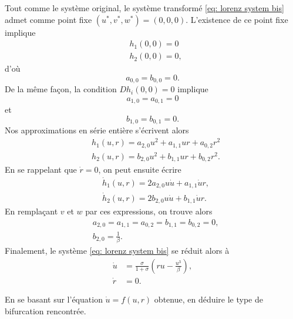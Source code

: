 \documentclass[12pt, answers]{exam}
\begin{document}
\begin{questions}
\begin{parts}
\begin{subparts}
      \begin{solution}
        {\color{blue}
        Tout comme le système original, le système transformé \eqref{eq: lorenz system bis} admet comme point fixe $(u^*, v^*, w^*) = (0, 0, 0)$. L'existence de ce point fixe implique
        $$
        \begin{aligned}
          & h_1(0, 0) = 0 \\
          & h_2(0, 0) = 0,
        \end{aligned}
        $$
        d'où
        $$
        a_{0, 0} = b_{0, 0} = 0.
        $$
        De la même fa\c{c}on, la condition $Dh_i(0, 0) = 0$ implique
        $$
        a_{1, 0} = a_{0, 1} = 0
        $$
        et
        $$
        b_{1, 0} = b_{0, 1} = 0.
        $$
        Nos approximations en série entière s'écrivent alors
        $$
        \begin{aligned}
          & h_1(u, r) = a_{2, 0} u^2 + a_{1, 1} u r + a_{0, 2} r^2 \\
          & h_2(u, r) = b_{2, 0} u^2 + b_{1, 1} u r + b_{0, 2} r^2.
        \end{aligned}
        $$
        En se rappelant que $\dot{r} = 0$, on peut ensuite écrire
        $$
        \begin{aligned}
          & \dot{h}_1(u, r) = 2 a_{2, 0} u \dot{u} + a_{1, 1} \dot{u} r, \\
          & \dot{h}_2(u, r) = 2 b_{2, 0} u \dot{u} + b_{1, 1} \dot{u} r.
        \end{aligned}
        $$
        En rempla\c{c}ant $v$ et $w$ par ces expressions, on trouve alors
        $$
        \begin{aligned}
          & a_{2, 0} = a_{1, 1} = a_{0, 2} = b_{1, 1} = b_{0, 2} = 0, \\
          & b_{2, 0} = \displaystyle \frac{1}{\beta}.
        \end{aligned}
        $$
        Finalement, le système \eqref{eq: lorenz system bis} se réduit alors à
        $$
        \begin{aligned}
          \dot{u} & = \displaystyle \frac{\sigma}{1 + \sigma} \left( ru - \frac{u^3}{\beta} \right), \\
          \dot{r} & = 0.
        \end{aligned}
        $$
        }
      \end{solution}

      \subpart[1] En se basant sur l'équation $\dot{u} = f(u, r)$ obtenue, en déduire le type de bifurcation rencontrée.


\end{subparts}
\end{parts}
\end{questions}
\end{document}
